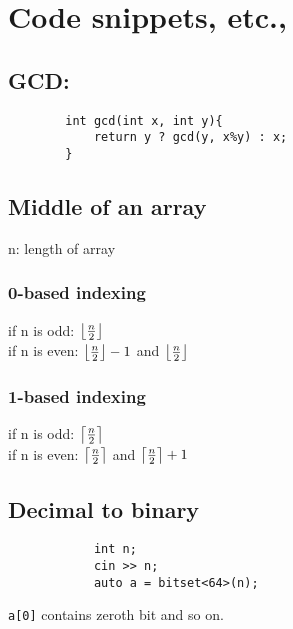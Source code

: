 \section{Code snippets, etc.,}

\subsection{GCD:}
\vspace{8pt}
	\begin{verbatim}
		int gcd(int x, int y){
		    return y ? gcd(y, x%y) : x;
		}
	\end{verbatim}

\subsection{Middle of an array}
    n: length of array\\
    \subsubsection{0-based indexing}
    if n is odd: $\floor*{\frac{n}{2}}$\\
    if n is even: $\floor*{\frac{n}{2}} - 1$ and $\floor*{\frac{n}{2}}$\\

    \subsubsection{1-based indexing}
    if n is odd: $\ceil*{\frac{n}{2}}$\\
    if n is even: $\ceil*{\frac{n}{2}}$ and $\ceil*{\frac{n}{2}} + 1$\\

    \subsection{Decimal to binary}
        \begin{verbatim}
            int n;
            cin >> n;
            auto a = bitset<64>(n);
        \end{verbatim}
    \texttt{a[0]} contains zeroth bit and so on.

\vfill \null
\columnbreak

